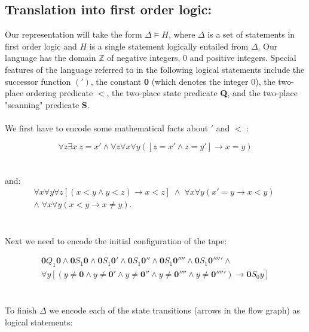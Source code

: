 \documentclass[a4paper,11pt]{article}
\begin{document}
\bigskip

\subsection*{Translation into first order logic:}

\bigskip

Our representation will take the form $\Delta \models H$, where $\Delta$ is a set of statements in 
first order logic and $H$ is a single statement logically entailed from $\Delta$. Our language has 
the domain $\mathbb{Z}$ of negative integers, 0 and positive integers. Special features of the language
referred to in the following logical statements include the successor function $(')$, the constant \textbf{0}
(which denotes the integer 0), the two-place ordering predicate $<$, the two-place state predicate \textbf{Q}, 
and the two-place "scanning" predicate \textbf{S}.
\\\\
We first have to encode some mathematical facts about $'$ and $<$ :

\begin{equation}
\forall z \exists x \: z=x' \land \forall z \forall x \forall y ([z=x' \land z=y'] \rightarrow x = y) 
\end{equation}	
\\\\
and:
\begin{multline}
\forall x \forall y \forall z [(x<y \land y<z) \rightarrow x<z] \; \land \; \forall x \forall y (x'=y \rightarrow x<y) 
\; \\ \land \; \forall x \forall y (x<y \rightarrow x \neq y).
\end{multline}
\\\\
Next we need to encode the initial configuration of the tape:


\begin{multline}
\textbf{0} Q_{1} \textbf{0} \land \textbf{0} S_{1} \textbf{0} \land \textbf{0} S_{1} \textbf{0}' \land
\textbf{0} S_{1} \textbf{0}'' \land \textbf{0} S_{1} \textbf{0}'''' \land \textbf{0} S_{1} \textbf{0}''''' \land \\
\forall y [(y \neq \textbf{0} \land y \neq \textbf{0}' \land y \neq \textbf{0}'' \land y \neq \textbf{0}'''' 
\land y \neq \textbf{0}''''') \rightarrow \textbf{0}S_{0}y]
\end{multline}
\\\\
To finish $\Delta$ we encode each of the state transitions (arrows in the flow graph) as logical statements:
\end{document}

